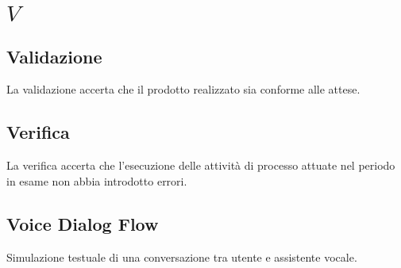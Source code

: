 \section{\quad$V\quad$}

\subsection{Validazione}
La validazione accerta che il prodotto realizzato sia conforme alle attese.


\subsection{Verifica}
La verifica accerta che l’esecuzione delle attività di processo attuate nel periodo in esame non abbia introdotto errori.

\subsection{Voice Dialog Flow}
Simulazione testuale di una conversazione tra utente e assistente vocale.


